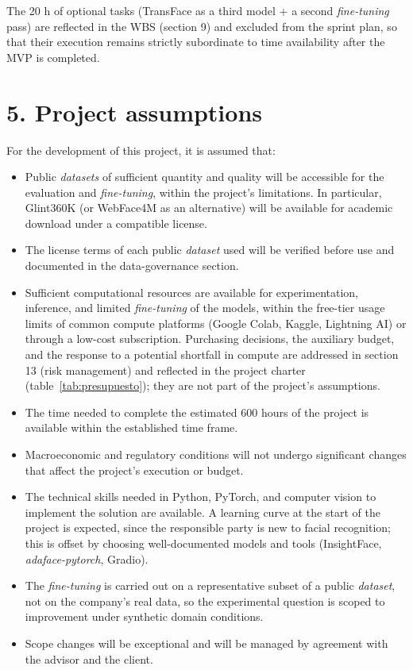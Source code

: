 \documentclass[
  11pt, %
]{charter}
\begin{document}
The 20 h of optional tasks (TransFace as a third model + a second \textit{fine-tuning} pass) are reflected in the WBS (section 9) and excluded from the sprint plan, so that their execution remains strictly subordinate to time availability after the MVP is completed.

\section{5. Project assumptions}
\label{sec:supuestos}

For the development of this project, it is assumed that:

\begin{itemize}
  \item Public \textit{datasets} of sufficient quantity and quality will be accessible for the evaluation and \textit{fine-tuning}, within the project's limitations. In particular, Glint360K (or WebFace4M as an alternative) will be available for academic download under a compatible license.
  \item The license terms of each public \textit{dataset} used will be verified before use and documented in the data-governance section.
  \item Sufficient computational resources are available for experimentation, inference, and limited \textit{fine-tuning} of the models, within the free-tier usage limits of common compute platforms (Google Colab, Kaggle, Lightning AI) or through a low-cost subscription. Purchasing decisions, the auxiliary budget, and the response to a potential shortfall in compute are addressed in section 13 (risk management) and reflected in the project charter (table~\ref{tab:presupuesto}); they are not part of the project's assumptions.
  \item The time needed to complete the estimated 600 hours of the project is available within the established time frame.
  \item Macroeconomic and regulatory conditions will not undergo significant changes that affect the project's execution or budget.
  \item The technical skills needed in Python, PyTorch, and computer vision to implement the solution are available. A learning curve at the start of the project is expected, since the responsible party is new to facial recognition; this is offset by choosing well-documented models and tools (InsightFace, \textit{adaface-pytorch}, Gradio).
  \item The \textit{fine-tuning} is carried out on a representative subset of a public \textit{dataset}, not on the company's real data, so the experimental question is scoped to improvement under synthetic domain conditions.
  \item Scope changes will be exceptional and will be managed by agreement with the advisor and the client.
\end{itemize}
\end{document}
